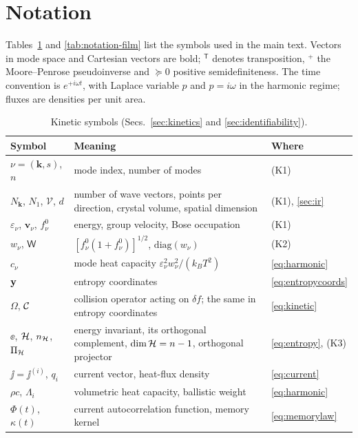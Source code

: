 \section{Notation}\label{app:notation}

Tables~\ref{tab:notation-kinetic} and \ref{tab:notation-film} list the symbols used in the main text.
Vectors in mode space and Cartesian vectors are bold; ${}^{\mathsf T}$ denotes transposition, ${}^+$ the
Moore--Penrose pseudoinverse and $\succeq0$ positive semidefiniteness. The time convention is
$e^{+i\omega t}$, with Laplace variable $p$ and $p=i\omega$ in the harmonic regime; fluxes are densities
per unit area.

\begin{table}[tbp]
\caption{Kinetic symbols (Secs.~\ref{sec:kinetics} and \ref{sec:identifiability}).}
\label{tab:notation-kinetic}
\footnotesize
\begin{ruledtabular}
\begin{tabular}{p{}p{}p{}}
Symbol & Meaning & Where\\ \hline
$\nu=(\mathbf k,s)$, $n$ & mode index, number of modes & (K1)\\
$N_{\mathbf k}$, $N_1$, $\mathcal V$, $d$ & number of wave vectors, points per direction, crystal volume, spatial dimension & (K1), \ref{sec:ir}\\
$\varepsilon_\nu$, $\mathbf v_\nu$, $f^0_\nu$ & energy, group velocity, Bose occupation & (K1)\\
$w_\nu$, $\mathsf W$ & $[f^0_\nu(1+f^0_\nu)]^{1/2}$, $\mathrm{diag}(w_\nu)$ & (K2)\\
$c_\nu$ & mode heat capacity $\varepsilon_\nu^2w_\nu^2/(k_BT^2)$ & \eqref{eq:harmonic}\\
$\mathbf y$ & entropy coordinates & \eqref{eq:entropycoords}\\
$\Omega$, $\mathcal C$ & collision operator acting on $\delta f$; the same in entropy coordinates & \eqref{eq:kinetic}\\
$\ee$, $\mathcal H$, $n_{\mathcal H}$, $\Pi_{\mathcal H}$ & energy invariant, its orthogonal complement, $\dim\mathcal H=n-1$, orthogonal projector & \eqref{eq:entropy}, (K3)\\
$\jj=\jj^{(i)}$, $q_i$ & current vector, heat-flux density & \eqref{eq:current}\\
$\rho c$, $\Lambda_i$ & volumetric heat capacity, ballistic weight & \eqref{eq:harmonic}\\
$\Phi(t)$, $\kappa(t)$ & current autocorrelation function, memory kernel & \eqref{eq:memorylaw}\\

\end{tabular}
\end{ruledtabular}
\end{table}
